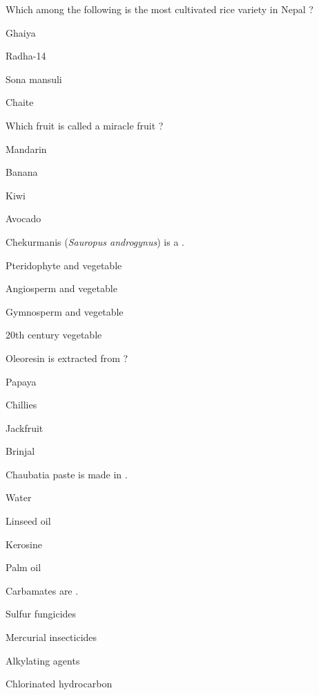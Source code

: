 \begin{questions}
\question Which among the following is the most cultivated rice variety in Nepal ?
\begin{items}
\item Ghaiya
\item Radha-14
\item* Sona mansuli
\item Chaite
\end{items}

\question Which fruit is called a miracle fruit ?
\begin{items}
\item Mandarin
\item Banana
\item Kiwi
\item Avocado
\end{items}

\question Chekurmanis (\textit{Sauropus androgynus}) is a \fillin[][3cm].
\begin{items}
\item Pteridophyte and vegetable
\item* Angiosperm and vegetable
\item Gymnosperm and vegetable
\item 20th century vegetable
\end{items}

\question Oleoresin is extracted from ?
\begin{items}
\item Papaya
\item* Chillies
\item Jackfruit
\item Brinjal
\end{items}

\question Chaubatia paste is made in \fillin[][3cm].
\begin{items}
\item Water
\item* Linseed oil
\item Kerosine
\item Palm oil
\end{items}

\question Carbamates are \fillin[][3cm].
\begin{items}
\item* Sulfur fungicides
\item Mercurial insecticides
\item Alkylating agents
\item Chlorinated hydrocarbon
\end{items}


\end{questions}

